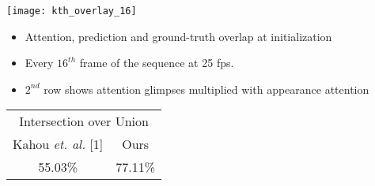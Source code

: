 
\vspace{1\baselineskip}

\begin{minipage}[c]{0.3\textwidth}
    \centering
    \vspace{-1.5em}
    \texttt{[image: kth\_overlay\_16]}
    
    \begin{minipage}[c]{0.6\textwidth}
        \begin{itemize}
            \item Attention, prediction and ground-truth overlap at initialization
            \item Every $16^{th}$ frame of the sequence at 25 fps.
            \item $2^{nd}$ row shows attention glimpses multiplied with appearance attention
        \end{itemize}
    \end{minipage}\hfill   
    {\large
    \begin{minipage}[c]{0.39\textwidth}
        \begin{tabular}{c|c}
            \multicolumn{2}{c}{Intersection over Union}\\
            Kahou \emph{et. al.} [1] & Ours\\
            \midrule
            55.03\% & 77.11\%
        \end{tabular}
    \end{minipage}
}
    \vspace{.5em}
\end{minipage}

